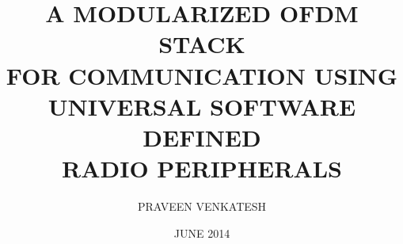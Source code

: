\title{A MODULARIZED OFDM STACK \\
       FOR COMMUNICATION USING \\
       UNIVERSAL SOFTWARE DEFINED \\
       RADIO PERIPHERALS}

\author{PRAVEEN VENKATESH}

\date{JUNE 2014}

\maketitle
